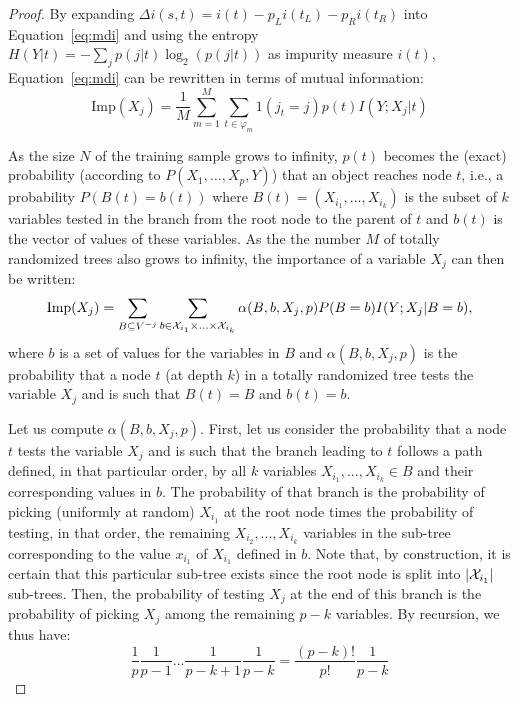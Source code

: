 \begin{proof}
By expanding $\Delta i(s, t) = i(t) - p_L i(t_L) - p_R i(t_R)$ into
Equation~\ref{eq:mdi} and using the entropy $H(Y|t) = -\sum_j p(j|t) \log_2(p(j|t))$
as impurity measure $i(t)$, Equation~\ref{eq:mdi} can be rewritten in terms of
mutual information:
\begin{equation}
\text{Imp}(X_j) = \frac{1}{M} \sum_{m=1}^M \sum_{t \in \varphi_m} 1(j_t = j) p(t) I(Y;X_j|t)
\end{equation}

As the size $N$ of the training sample grows to infinity, $p(t)$ becomes the
(exact) probability (according to $P(X_1,\ldots,X_p,Y)$) that an object reaches
node $t$, i.e., a probability $P(B(t)=b(t))$ where $B(t)=(X_{i_1}, ...,
X_{i_{k}})$ is the subset of $k$ variables tested in the branch from the root
node to the parent of $t$ and $b(t)$ is the vector of values of these
variables. As the the number $M$ of totally randomized trees also grows to
infinity, the importance of a variable $X_j$ can then be written:
\begin{equation}
\text{Imp}(X_j)=\sum_{B\subseteq V^{-j}} \sum_{b\in {\cal X}_{i_1}\times ... \times {\cal X}_{i_{k}} } \alpha(B,b,X_j,p) P(B=b) I(Y;X_j|B=b),
\end{equation}
where $b$ is a set of values for the variables in $B$ and $\alpha(B,b,X_j,p)$ is
the probability that a node $t$ (at depth $k$) in a totally randomized tree
tests the variable $X_j$ and is such that $B(t)=B$ and $b(t)=b$.

Let us compute $\alpha(B,b,X_j,p)$. First, let us consider the probability that
a node $t$ tests the variable $X_j$ and is such that the branch leading to $t$
follows a path defined, in that particular order, by all $k$ variables $X_{i_1},
..., X_{i_{k}} \in B$ and their corresponding values in $b$. The probability of
that branch is the probability of picking (uniformly at random)  $X_{i_1}$  at
the root node times the probability of testing, in that order, the remaining
$X_{i_2}, ..., X_{i_{k}}$ variables in the sub-tree corresponding to the value
$x_{i_1}$ of $X_{i_1}$ defined in $b$. Note that, by construction, it is certain
that this particular sub-tree exists since the root node is split into $|{\cal
X}_{i_1}|$ sub-trees.  Then, the
probability of testing $X_j$ at the end of this branch is the probability of
picking $X_j$ among the remaining $p-k$ variables. By recursion, we thus have:
\begin{equation}
\frac{1}{p} \frac{1}{p-1} ... \frac{1}{p-k+1} \frac{1}{p-k} = \frac{(p-k)!}{p!} \frac{1}{p-k}
\end{equation}


\end{proof}

